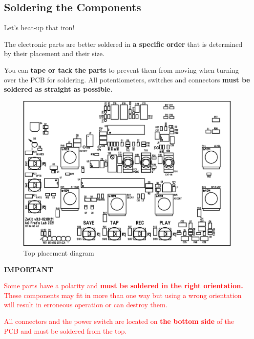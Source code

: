 \documentclass{scrartcl}
\begin{document}
\pagebreak
\subsection{Soldering the Components}
\Large
Let's heat-up that iron!
\normalsize

The electronic parts are better soldered in \textbf{a specific order} that is determined by their placement and their size.

You can \textbf{tape or tack the parts} to prevent them from moving when turning over the PCB for soldering.
All potentiometers, switches and connectors \textbf{must be soldered as straight as possible.}

\begin{figure}[!ht]
    \begin{center}
        \includegraphics[scale=0.70]{assets/pcb-top.png}
        \caption{Top placement diagram}
    \end{center}
\end{figure}

\vspace{0.5cm}
\textbf{IMPORTANT}

\begin{tcolorbox}
    \textcolor{red}{
        Some parts have a polarity and \textbf{must be soldered in the right orientation.} These components may fit in more than one way but using a wrong orientation will result in erroneous operation or can destroy them.
    }
\end{tcolorbox}

\vspace{0.25cm}

\begin{tcolorbox}
    \textcolor{red}{
        All connectors and the power switch are located on \textbf{the bottom side} of the PCB and must be soldered from the top.
    }
\end{tcolorbox}
\end{document}

